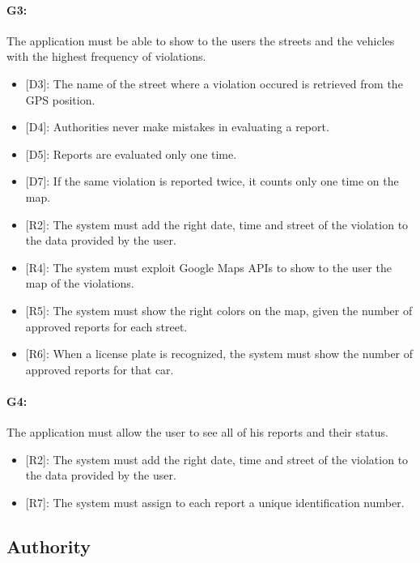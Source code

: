 \documentclass[12pt,a4paper]{report}
\begin{document}
			\paragraph {G3:} The application must be able to show to the users the streets and the vehicles with the highest frequency of violations.
		\begin{itemize}
			\item{[D3]:} The name of the street where a violation occured is retrieved from the GPS position.
			\item{[D4]:} Authorities never make mistakes in evaluating a report.
			\item{[D5]:} Reports are evaluated only one time.
			\item{[D7]:} If the same violation is reported twice, it counts only one time on the map.
		\end{itemize}
		\begin{itemize}
			\item{[R2]:} The system must add the right date, time and street of the violation to the data provided by the user.
			\item{[R4]:} The system must exploit Google Maps APIs to show to the user the map of the violations.
			\item{[R5]:} The system must show the right colors on the map, given the number of approved reports for each street.
			\item{[R6]:} When a license plate is recognized, the system must show the number of approved reports for that car.
		\end{itemize}
			\paragraph {G4:}  The application must allow the user to see all of his reports and their status.
		\begin{itemize}
			\item{[R2]:} The system must add the right date, time and street of the violation to the data provided by the user.
			\item{[R7]:} The system must assign to each report a unique identification number.
		\end{itemize}

		\subsection{Authority}
\end{document}
